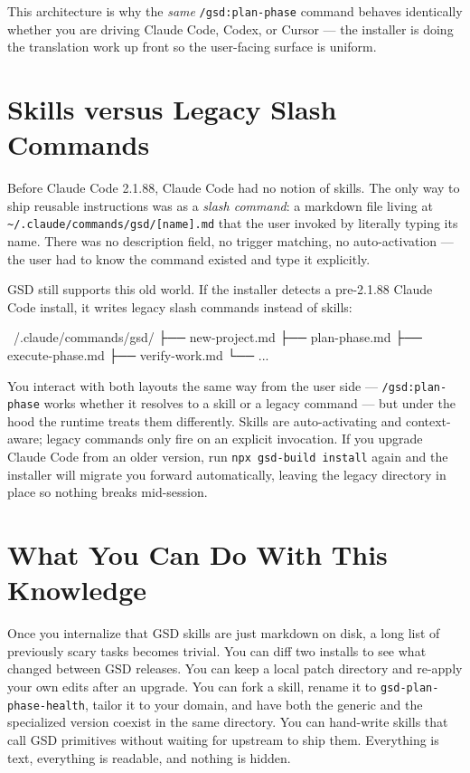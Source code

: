 \documentclass[11pt,letterpaper,openany]{book}
\begin{document}
This architecture is why the \emph{same} \texttt{/gsd:plan-phase} command
behaves identically whether you are driving Claude Code, Codex, or Cursor
--- the installer is doing the translation work up front so the user-facing
surface is uniform.

\section{Skills versus Legacy Slash Commands}

Before Claude Code 2.1.88, Claude Code had no notion of skills. The only
way to ship reusable instructions was as a \emph{slash command}: a
markdown file living at \texttt{\~{}/.claude/commands/gsd/[name].md} that
the user invoked by literally typing its name. There was no description
field, no trigger matching, no auto-activation --- the user had to know
the command existed and type it explicitly.

GSD still supports this old world. If the installer detects a pre-2.1.88
Claude Code install, it writes legacy slash commands instead of skills:

\begin{gsdplain}
~/.claude/commands/gsd/
├── new-project.md
├── plan-phase.md
├── execute-phase.md
├── verify-work.md
└── ...
\end{gsdplain}

You interact with both layouts the same way from the user side ---
\texttt{/gsd:plan-phase} works whether it resolves to a skill or a legacy
command --- but under the hood the runtime treats them differently. Skills
are auto-activating and context-aware; legacy commands only fire on an
explicit invocation. If you upgrade Claude Code from an older version, run
\texttt{npx gsd-build install} again and the installer will migrate you
forward automatically, leaving the legacy directory in place so nothing
breaks mid-session.

\section{What You Can Do With This Knowledge}

Once you internalize that GSD skills are just markdown on disk, a long
list of previously scary tasks becomes trivial. You can diff two installs
to see what changed between GSD releases. You can keep a local patch
directory and re-apply your own edits after an upgrade. You can fork a
skill, rename it to \texttt{gsd-plan-phase-health}, tailor it to your
domain, and have both the generic and the specialized version coexist in
the same directory. You can hand-write skills that call GSD primitives
without waiting for upstream to ship them. Everything is text, everything
is readable, and nothing is hidden.
\end{document}
